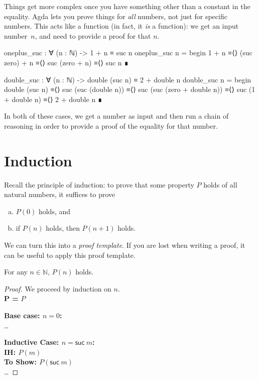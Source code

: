\documentclass{lecturenotes}
\begin{document}
Things get more complex once you have something other than a constant in the equality.
Agda lets you prove things for \emph{all} numbers, not just for specific numbers.
This acts like a function (in fact, it \emph{is} a function): we get an input number~$n$, and need to provide a proof for that $n$.
\begin{center}
\begin{code}
  oneplus_suc : ∀ (n : ℕ) -> 1 + n ≡ suc n
  oneplus_suc n =
    begin
      1 + n
    ≡⟨⟩
      (suc zero) + n
    ≡⟨⟩
      suc (zero + n)
    ≡⟨⟩
      suc n
      ∎

  double_suc : ∀ (n : ℕ) -> double (suc n) ≡ 2 + double n
  double_suc n =
    begin
      double (suc n)
    ≡⟨⟩
      suc (suc (double n))
    ≡⟨⟩
      suc (suc (zero + double n))
    ≡⟨⟩
      suc (1 + double n)
    ≡⟨⟩
      2 + double n
    ∎
\end{code}
\end{center}
In both of these cases, we get a number as input and then run a chain of reasoning in order to provide a proof of the equality for that number.

\pagebreak
\section{Induction}
\label{sec:induction}

Recall the principle of induction: to prove that some property $P$ holds of all natural numbers, it suffices to prove
\begin{enumerate}[(a)]
\item $P(0)$ holds, and
\item if $P(n)$ holds, then $P(n + 1)$ holds.
\end{enumerate}

We can turn this into a \emph{proof template}.
If you are lost when writing a proof, it can be useful to apply this proof template.
\begin{thm}
  For any $n \in \mathbb{N}$, $P(n)$ holds.
\end{thm}
\begin{proof}
  We proceed by induction on $n$.\\
  \textbf{P =} $P$

  \noindent\textbf{Base case: $n = 0$:}\\
  \dots
  
  \noindent\textbf{Inductive Case: $n = \textsf{suc}~m$:}\\
  \textbf{IH: $P(m)$}\\
  \textbf{To Show: $P(\textsf{suc}~m)$}\\
  \dots
\end{proof}
\end{document}
